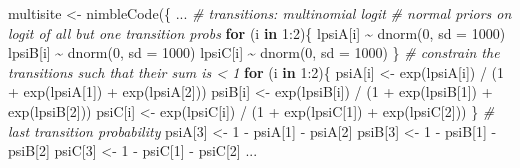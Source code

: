 \documentclass[
  12pt,
]{krantz}
\newenvironment{Shaded}{\begin{snugshade}}{\end{snugshade}}
\newcommand{\AttributeTok}[1]{\textcolor[rgb]{0.77,0.63,0.00}{#1}}
\newcommand{\CommentTok}[1]{\textcolor[rgb]{0.56,0.35,0.01}{\textit{#1}}}
\newcommand{\ControlFlowTok}[1]{\textcolor[rgb]{0.13,0.29,0.53}{\textbf{#1}}}
\newcommand{\DecValTok}[1]{\textcolor[rgb]{0.00,0.00,0.81}{#1}}
\newcommand{\FunctionTok}[1]{\textcolor[rgb]{0.00,0.00,0.00}{#1}}
\newcommand{\NormalTok}[1]{#1}
\newcommand{\OtherTok}[1]{\textcolor[rgb]{0.56,0.35,0.01}{#1}}
\newcommand{\SpecialCharTok}[1]{\textcolor[rgb]{0.00,0.00,0.00}{#1}}
\begin{document}
\begin{Shaded}
\begin{Highlighting}[]
\NormalTok{multisite }\OtherTok{\textless{}{-}} \FunctionTok{nimbleCode}\NormalTok{(\{}
\NormalTok{...}
  \CommentTok{\# transitions: multinomial logit}
  \CommentTok{\# normal priors on logit of all but one transition probs}
  \ControlFlowTok{for}\NormalTok{ (i }\ControlFlowTok{in} \DecValTok{1}\SpecialCharTok{:}\DecValTok{2}\NormalTok{)\{}
\NormalTok{    lpsiA[i] }\SpecialCharTok{\textasciitilde{}} \FunctionTok{dnorm}\NormalTok{(}\DecValTok{0}\NormalTok{, }\AttributeTok{sd =} \DecValTok{1000}\NormalTok{)}
\NormalTok{    lpsiB[i] }\SpecialCharTok{\textasciitilde{}} \FunctionTok{dnorm}\NormalTok{(}\DecValTok{0}\NormalTok{, }\AttributeTok{sd =} \DecValTok{1000}\NormalTok{)}
\NormalTok{    lpsiC[i] }\SpecialCharTok{\textasciitilde{}} \FunctionTok{dnorm}\NormalTok{(}\DecValTok{0}\NormalTok{, }\AttributeTok{sd =} \DecValTok{1000}\NormalTok{)}
\NormalTok{  \}}
  \CommentTok{\# constrain the transitions such that their sum is \textless{} 1}
  \ControlFlowTok{for}\NormalTok{ (i }\ControlFlowTok{in} \DecValTok{1}\SpecialCharTok{:}\DecValTok{2}\NormalTok{)\{}
\NormalTok{    psiA[i] }\OtherTok{\textless{}{-}} \FunctionTok{exp}\NormalTok{(lpsiA[i]) }\SpecialCharTok{/}\NormalTok{ (}\DecValTok{1} \SpecialCharTok{+} \FunctionTok{exp}\NormalTok{(lpsiA[}\DecValTok{1}\NormalTok{]) }\SpecialCharTok{+} \FunctionTok{exp}\NormalTok{(lpsiA[}\DecValTok{2}\NormalTok{]))}
\NormalTok{    psiB[i] }\OtherTok{\textless{}{-}} \FunctionTok{exp}\NormalTok{(lpsiB[i]) }\SpecialCharTok{/}\NormalTok{ (}\DecValTok{1} \SpecialCharTok{+} \FunctionTok{exp}\NormalTok{(lpsiB[}\DecValTok{1}\NormalTok{]) }\SpecialCharTok{+} \FunctionTok{exp}\NormalTok{(lpsiB[}\DecValTok{2}\NormalTok{]))}
\NormalTok{    psiC[i] }\OtherTok{\textless{}{-}} \FunctionTok{exp}\NormalTok{(lpsiC[i]) }\SpecialCharTok{/}\NormalTok{ (}\DecValTok{1} \SpecialCharTok{+} \FunctionTok{exp}\NormalTok{(lpsiC[}\DecValTok{1}\NormalTok{]) }\SpecialCharTok{+} \FunctionTok{exp}\NormalTok{(lpsiC[}\DecValTok{2}\NormalTok{]))}
\NormalTok{  \}}
  \CommentTok{\# last transition probability}
\NormalTok{  psiA[}\DecValTok{3}\NormalTok{] }\OtherTok{\textless{}{-}} \DecValTok{1} \SpecialCharTok{{-}}\NormalTok{ psiA[}\DecValTok{1}\NormalTok{] }\SpecialCharTok{{-}}\NormalTok{ psiA[}\DecValTok{2}\NormalTok{]}
\NormalTok{  psiB[}\DecValTok{3}\NormalTok{] }\OtherTok{\textless{}{-}} \DecValTok{1} \SpecialCharTok{{-}}\NormalTok{ psiB[}\DecValTok{1}\NormalTok{] }\SpecialCharTok{{-}}\NormalTok{ psiB[}\DecValTok{2}\NormalTok{]}
\NormalTok{  psiC[}\DecValTok{3}\NormalTok{] }\OtherTok{\textless{}{-}} \DecValTok{1} \SpecialCharTok{{-}}\NormalTok{ psiC[}\DecValTok{1}\NormalTok{] }\SpecialCharTok{{-}}\NormalTok{ psiC[}\DecValTok{2}\NormalTok{]}
\NormalTok{...}
\end{Highlighting}
\end{Shaded}
\end{document}
